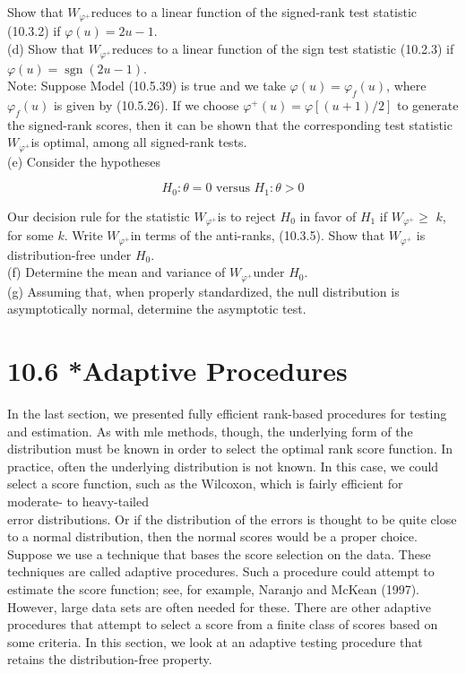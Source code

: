 Show that $W_{\varphi^{+}}$reduces to a linear function of the signed-rank test statistic (10.3.2) if $\varphi(u)=2 u-1$.\\
(d) Show that $W_{\varphi^{+}}$reduces to a linear function of the sign test statistic (10.2.3) if $\varphi(u)=\operatorname{sgn}(2 u-1)$.\\
Note: Suppose Model (10.5.39) is true and we take $\varphi(u)=\varphi_{f}(u)$, where $\varphi_{f}(u)$ is given by (10.5.26). If we choose $\varphi^{+}(u)=\varphi[(u+1) / 2]$ to generate the signed-rank scores, then it can be shown that the corresponding test statistic $W_{\varphi^{+}}$is optimal, among all signed-rank tests.\\
(e) Consider the hypotheses

$$
H_{0}: \theta=0 \text { versus } H_{1}: \theta>0
$$

Our decision rule for the statistic $W_{\varphi^{+}}$is to reject $H_{0}$ in favor of $H_{1}$ if $W_{\varphi^{+}} \geq$ $k$, for some $k$. Write $W_{\varphi^{+}}$in terms of the anti-ranks, (10.3.5). Show that $W_{\varphi^{+}}$ is distribution-free under $H_{0}$.\\
(f) Determine the mean and variance of $W_{\varphi^{+}}$under $H_{0}$.\\
(g) Assuming that, when properly standardized, the null distribution is asymptotically normal, determine the asymptotic test.

\section*{10.6 *Adaptive Procedures}
In the last section, we presented fully efficient rank-based procedures for testing and estimation. As with mle methods, though, the underlying form of the distribution must be known in order to select the optimal rank score function. In practice, often the underlying distribution is not known. In this case, we could select a score function, such as the Wilcoxon, which is fairly efficient for moderate- to heavy-tailed\\
error distributions. Or if the distribution of the errors is thought to be quite close to a normal distribution, then the normal scores would be a proper choice. Suppose we use a technique that bases the score selection on the data. These techniques are called adaptive procedures. Such a procedure could attempt to estimate the score function; see, for example, Naranjo and McKean (1997). However, large data sets are often needed for these. There are other adaptive procedures that attempt to select a score from a finite class of scores based on some criteria. In this section, we look at an adaptive testing procedure that retains the distribution-free property.

